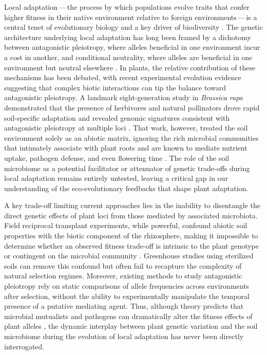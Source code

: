 \documentclass{article}
\begin{document}
Local adaptation\,---\,the process by which populations evolve traits that confer higher fitness in their native environment relative to foreign environments\,---\,is a central tenet of evolutionary biology and a key driver of biodiversity \cite{kawecki2004conceptual,savolainen2013ecological}. The genetic architecture underlying local adaptation has long been framed by a dichotomy between antagonistic pleiotropy, where alleles beneficial in one environment incur a cost in another, and conditional neutrality, where alleles are beneficial in one environment but neutral elsewhere \cite{anderson2011local,fournier2012pleiotropy}. In plants, the relative contribution of these mechanisms has been debated, with recent experimental evolution evidence suggesting that complex biotic interactions can tip the balance toward antagonistic pleiotropy. A landmark eight-generation study in \emph{Brassica rapa} demonstrated that the presence of herbivores and natural pollinators drove rapid soil-specific adaptation and revealed genomic signatures consistent with antagonistic pleiotropy at multiple loci \cite{smith2024biotic}. That work, however, treated the soil environment solely as an abiotic matrix, ignoring the rich microbial communities that intimately associate with plant roots and are known to mediate nutrient uptake, pathogen defense, and even flowering time \cite{berendsen2012rhizosphere,lau2012rapid}. The role of the soil microbiome as a potential facilitator or attenuator of genetic trade-offs during local adaptation remains entirely untested, leaving a critical gap in our understanding of the eco-evolutionary feedbacks that shape plant adaptation.

A key trade-off limiting current approaches lies in the inability to disentangle the direct genetic effects of plant loci from those mediated by associated microbiota. Field reciprocal transplant experiments, while powerful, confound abiotic soil properties with the biotic component of the rhizosphere, making it impossible to determine whether an observed fitness trade-off is intrinsic to the plant genotype or contingent on the microbial community \cite{fitzpatrick2020soil,thrall2015tradeoffs}. Greenhouse studies using sterilized soils can remove this confound but often fail to recapture the complexity of natural selection regimes. Moreover, existing methods to study antagonistic pleiotropy rely on static comparisons of allele frequencies across environments after selection, without the ability to experimentally manipulate the temporal presence of a putative mediating agent. Thus, although theory predicts that microbial mutualists and pathogens can dramatically alter the fitness effects of plant alleles \cite{heath2017mutualist}, the dynamic interplay between plant genetic variation and the soil microbiome during the evolution of local adaptation has never been directly interrogated.
\end{document}
